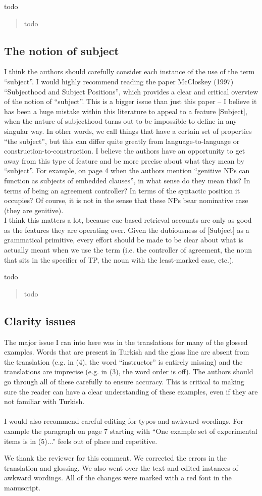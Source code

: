 \documentclass{ar2rc}
\begin{document}
\AC todo

\begin{quote}
    todo 
\end{quote}

\subsection{The notion of subject}

\RC I think the authors should carefully consider each instance of the use of the term ``subject''. I would highly recommend reading the paper McCloskey (1997) ``Subjecthood and Subject Positions'', which provides a clear and critical overview of the notion of ``subject''. This is a bigger issue than just this paper – I believe it has been a huge mistake within this literature to appeal to a feature [Subject], when the nature of subjecthood turns out to be impossible to define in any singular way. In other words, we call things that have a certain set of properties ``the subject'', but this can differ quite greatly from language-to-language or construction-to-construction. I believe the authors have an opportunity to get away from this type of feature and be more precise about what they mean by ``subject''. For example, on page 4 when the authors mention ``genitive NPs can function as subjects of embedded clauses'', in what sense do they mean this? In terms of being an agreement controller? In terms of the syntactic position it occupies? Of course, it is not in the sense that these NPs bear nominative case (they are genitive).\\
I think this matters a lot, because cue-based retrieval accounts are only as good as the features they are operating over. Given the dubiousness of [Subject] as a grammatical primitive, every effort should be made to be clear about what is actually meant when we use the term (i.e. the controller of agreement, the noun that sits in the specifier of TP, the noun with the least-marked case, etc.).

\AC todo

\begin{quote}
    todo 
\end{quote}


\subsection{Clarity issues}

\RC The major issue I ran into here was in the translations for many of the glossed examples. Words that are present in Turkish and the gloss line are absent from the translation (e.g. in (4), the word ``instructor'' is entirely missing) and the translations are imprecise (e.g. in (3), the word order is off). The authors should go through all of these carefully to ensure accuracy. This is critical to making sure the reader can have a clear understanding of these examples, even if they are not familiar with Turkish.\\\\
I would also recommend careful editing for typos and awkward wordings. For example the paragraph on page 7 starting with ``One example set of experimental items is in (5)...'' feels out of place and repetitive.

\AC We thank the reviewer for this comment. We corrected the errors in the translation and glossing. We also went over the text and edited instances of awkward wordings. All of the changes were marked with a red font in the manuscript.


\clearpage 
\end{document}
